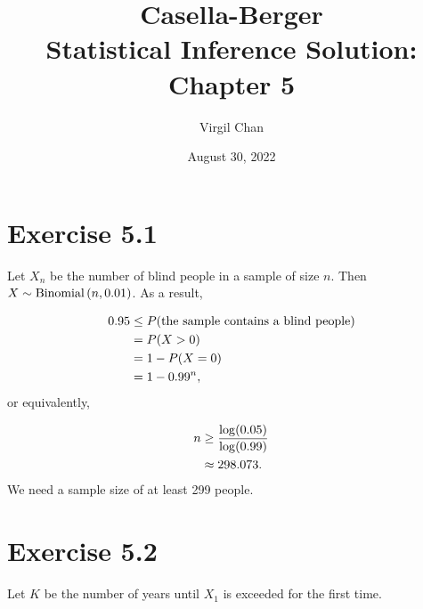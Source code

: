 \documentclass[12pt,letterpaper,reqno]{amsart}
\author{Virgil Chan}
\title{Casella-Berger \\ Statistical Inference Solution: \\ Chapter 5}
\date{August 30, 2022}
\numberwithin{equation}{subsection}
\begin{document}
\maketitle

\tableofcontents

\newpage
\section{Exercise 5.1}

Let $X_n$ be the number of blind people in a sample of size $n$. Then $X \sim \operatorname{Binomial}\left( {n, 0.01}\right)$. As a result,

\begin{align*}
    0.95 & \leq {P}\! \left( {\mbox{the sample contains a blind people}} \right) \\
    &= {P}\! \left( {X > 0} \right) \\
    &= 1 - {P}\! \left( {X = 0} \right) \\
    &= 1 - 0.99^n,
\end{align*}
or equivalently,

\begin{align*}
    n &\geq  \frac{{\log}\! \left( {0.05} \right)}{{\log}\! \left( {0.99} \right)} \\
    &\approx 298.073.
\end{align*}
We need a sample size of at least 299 people.

\newpage
\section{Exercise 5.2}

Let $K$ be the number of years until $X_1$ is exceeded for the first time.
\end{document}
